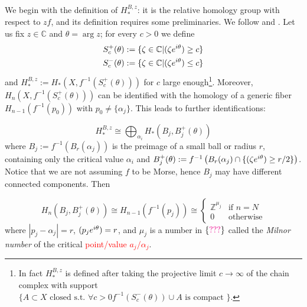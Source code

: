 \documentclass{article}
\let\Re\relax
\DeclareMathOperator{\Re}{Re}
\theoremstyle{definition}
\newcommand{\Z}{\mathbb{Z}}
\newcommand{\C}{\mathbb{C}}
\theoremstyle{plain}
\begin{document}
We begin with the definition of $H_{*}^{B,z}$: it is the relative homology group with respect to $zf$, and its definition requires some preliminaries. We follow \cite{pham} and \cite[Section 1]{Arnold}. Let us fix $z\in\C$ and $\theta=\arg z$; for every $c>0$ we define 
\begin{align*}
    S_c^+(\theta) &:=\lbrace \zeta\in\C \vert \Re (\zeta e^{i\theta})\geq c \rbrace\\
    S_c^-(\theta)&:=\lbrace \zeta\in\C \vert \Re (\zeta e^{i\theta})\leq c \rbrace
\end{align*}
and $H_{*}^{B,z}:=H_{*}(X,f^{-1}(S_c^+(\theta)))$ for $c$ large enough\footnote{In fact $H_{*}^{B,z}$ is defined after taking the projective limit $c\to\infty$ of the chain complex with support $\{A\subset X \text{ closed s.t. } \forall c>0 f^{-1}(S_c^-(\theta))\cup A \text{ is compact }  \}$.}. Moreover, $H_n(X,f^{-1}(S_c^+(\theta)))$ can be identified with the homology of a generic fiber $H_{n-1}(f^{-1}(p_0))$ with $p_0\neq \{\alpha_j\}$. This leads to further identifications:

\begin{equation}
    H_{*}^{B,z}\cong \bigoplus_{\alpha_i} H_{*}(B_j, B_j^+(\theta))
\end{equation}
where $B_j:=f^{-1}(B_r(\alpha_j))$ is the preimage of a small ball or radius $r$, containing only the critical value $\alpha_i$ and $B_j^+(\theta):=f^{-1}\left(B_r(\alpha_j)\cap \{ \Re (\zeta e^{i\theta})\geq r/2\}\right)$. Notice that we are not assuming $f$ to be Morse, hence $B_j$ may have different connected components. Then 

\begin{equation}
    H_{n}(B_j, B_j^+(\theta))\cong H_{n-1}(f^{-1}(p_j))\cong \begin{cases} \Z^{\mu_j} & \text{if } n=N\\
     0 & \text{otherwise}
    \end{cases}
\end{equation}
where $|p_j-\alpha_j|=r$, $\Re(p_j e^{i\theta})=r$, and $\mu_j$ is a number in $\{\textcolor{magenta}{???}\}$ called the {\em Milnor number} of the critical \textcolor{red}{point/value $a_j/\alpha_j$}. 
\end{document}
